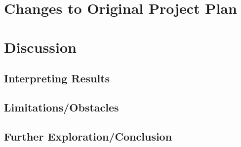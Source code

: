 \documentclass[fontsize=11pt]{article}
\begin{document}
\section*{Changes to Original Project Plan}

\section*{Discussion}

\subsection*{Interpreting Results}

\subsection*{Limitations/Obstacles}

\subsection*{Further Exploration/Conclusion}

\nocite{*} %

\end{document}
